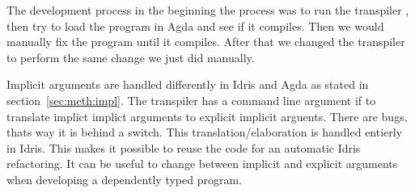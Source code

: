The development process in the beginning the process was to run the transpiler
, then try to load the program in Agda and see if it compiles.  Then we would
manually fix the program until it compiles.  After that we changed the
transpiler to perform the same change we just did manually.



Implicit arguments are handled differently in Idris and Agda as
stated in section~\ref{sec:meth:impl}. The transpiler has a command line
argument if to translate implict implict arguments to explicit implicit
arguents. There are bugs, thats way it is behind a switch. This
translation/elaboration is handled entierly in Idris. This makes it possible to
reuse the code for an automatic Idris refactoring.  It can be useful to change
between implicit and explicit arguments when developing a dependently typed
program.






